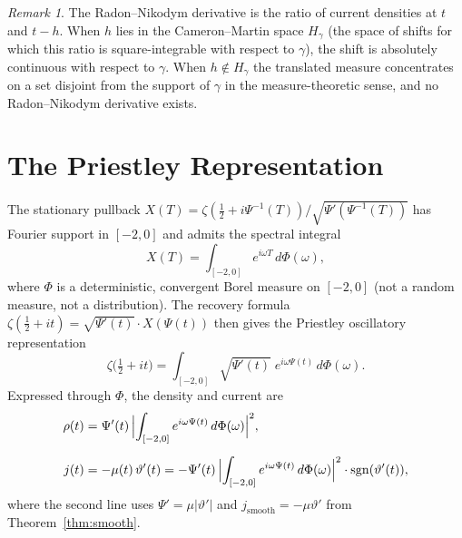 \documentclass[11pt]{article}
\theoremstyle{plain}
\theoremstyle{definition}
\theoremstyle{remark}
\newtheorem*{remark}{Remark}
\begin{document}
\begin{remark}
The Radon--Nikodym derivative is the ratio of current densities at
$t$ and $t-h$. When $h$ lies in the Cameron--Martin space $H_\gamma$
(the space of shifts for which this ratio is square-integrable with
respect to $\gamma$), the shift is absolutely continuous with respect
to $\gamma$. When $h\notin H_\gamma$ the translated measure
concentrates on a set disjoint from the support of $\gamma$ in the
measure-theoretic sense, and no Radon--Nikodym derivative exists.
\end{remark}

\section{The Priestley Representation}

The stationary pullback $X(T) = \zeta(\tfrac{1}{2}+i\Psi^{-1}(T))
/\sqrt{\Psi'(\Psi^{-1}(T))}$ has Fourier support in $[-2,0]$ and
admits the spectral integral
\[
X(T) = \int_{[-2,0]} e^{i\omega T}\,d\Phi(\omega),
\]
where $\Phi$ is a deterministic, convergent Borel measure on $[-2,0]$
(not a random measure, not a distribution). The recovery formula
$\zeta(\tfrac{1}{2}+it) = \sqrt{\Psi'(t)}\cdot X(\Psi(t))$ then
gives the Priestley oscillatory representation
\[
\zeta\!\bigl(\tfrac{1}{2}+it\bigr)
= \int_{[-2,0]}\sqrt{\Psi'(t)}\;e^{i\omega\Psi(t)}\,d\Phi(\omega).
\]
Expressed through $\Phi$, the density and current are
\begin{align}
\rho(t) &= \Psi'(t)\,\Bigl|\int_{[-2,0]}e^{i\omega\Psi(t)}\,d\Phi(\omega)\Bigr|^2,\\[6pt]
j(t) &= -\mu(t)\,\vartheta'(t)
= -\Psi'(t)\,\Bigl|\int_{[-2,0]}e^{i\omega\Psi(t)}\,d\Phi(\omega)\Bigr|^2
\cdot\operatorname{sgn}(\vartheta'(t)),
\end{align}
where the second line uses $\Psi' = \mu|\vartheta'|$ and
$j_{\mathrm{smooth}} = -\mu\vartheta'$ from Theorem~\ref{thm:smooth}.
\end{document}
